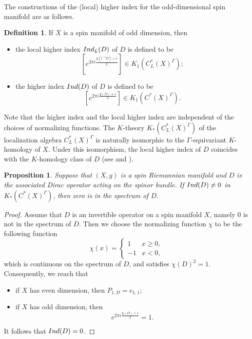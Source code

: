 \documentclass[12pt, reqno]{amsart}
\theoremstyle{plain}%
\newtheorem{proposition}[theorem]{Proposition}
\theoremstyle{definition}
\newtheorem{definition}[theorem]{Definition}
\theoremstyle{remark}
\numberwithin{equation}{section}
\newcommand{\ind}{\textup{Ind}}
\begin{document}
The constructions of the (local) higher index for the odd-dimensional spin manifold are as follows.
\begin{definition}\label{def:ind-odd}
If $X$ is a spin manifold of odd dimension, then
\begin{itemize}
	\item  the local higher index  $\ind_L(D)$ of $D$  is defined to be 
	\[ [e^{2\pi i\frac{\chi(t^{-1}D)+1}{2}}] \in K_1(C^*_L(X)^\Gamma);\]
	
	\item  the higher index  $\ind(D)$ of $D$ is defined to be  
	\[ [e^{2\pi i\frac{\chi(D)+1}{2}}] \in K_1(C^*(X)^\Gamma). \]
\end{itemize}

\end{definition}

Note that the higher index and the local higher index are independent of the choices of normalizing functions. The $K$-theory $K_\ast(C^*_L(X)^\Gamma)$ of the localization algebra $C^*_L(X)^\Gamma$ is naturally isomorphic to  the $\Gamma$-equivariant $K$-homology of $X$. Under this isomorphism, the local higher index of $D$ coincides with the $K$-homology class of $D$ (see \cite[Theorem 3.2]{Yulocalization} and \cite[Theorem 3.4]{QiaoRoe}).


\begin{proposition} \label{prop: nozero_index_zero_spectrum}
	Suppose that $(X,g)$ is a spin Riemannian manifold and $D$ is the associated Dirac operator acting on the spinor bundle.	If $\ind(D)\ne 0$ in $K_*(C^*(X)^\Gamma)$, then zero is in the spectrum of $D$.
\end{proposition}
\begin{proof}
Assume that $D$ is an invertible operator on a spin manifold $X$, namely $0$ is not in the spectrum of $D$. Then we choose the normalizing function $\chi$ to be the following function
$$\chi(x)=\begin{cases}
	1&x\geq 0,\\-1&x<0,
\end{cases}$$
which is continuous on the spectrum of $D$, and satisfies $\chi(D)^2=1$. Consequently, we reach that
\begin{itemize}
	\item if $X$ has even dimension, then $P_{1,D}=e_{1,1}$;
	\item if $X$ has odd dimension, then $$e^{2\pi i \frac{\chi(D)+1}{2}}=1.$$
\end{itemize}
 It follows that $\ind(D)=0$. 
\end{proof}
\end{document}
